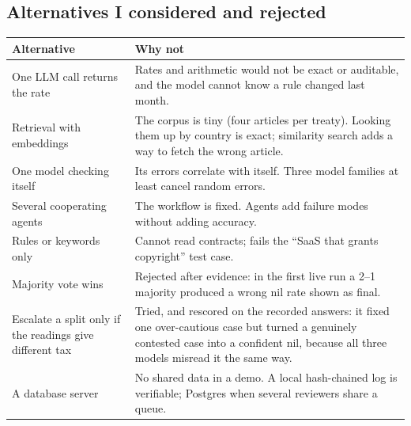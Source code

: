 \documentclass[10pt,a4paper]{article}
\begin{document}
\subsection{Alternatives I considered and rejected}
\begin{tabularx}{\linewidth}{@{}p{50mm}L@{}}
\toprule
\textbf{Alternative} & \textbf{Why not}\\\midrule
One LLM call returns the rate & Rates and arithmetic would not be exact or auditable, and the model cannot know a rule changed last month.\\
Retrieval with embeddings & The corpus is tiny (four articles per treaty). Looking them up by country is exact; similarity search adds a way to fetch the wrong article.\\
One model checking itself & Its errors correlate with itself. Three model families at least cancel random errors.\\
Several cooperating agents & The workflow is fixed. Agents add failure modes without adding accuracy.\\
Rules or keywords only & Cannot read contracts; fails the ``SaaS that grants copyright'' test case.\\
Majority vote wins & Rejected after evidence: in the first live run a 2--1 majority produced a wrong nil rate shown as final.\\
Escalate a split only if the readings give different tax & Tried, and rescored on the recorded answers: it fixed one over-cautious case but turned a genuinely contested case into a confident nil, because all three models misread it the same way.\\
A database server & No shared data in a demo. A local hash-chained log is verifiable; Postgres when several reviewers share a queue.\\
\bottomrule
\end{tabularx}

\end{document}
